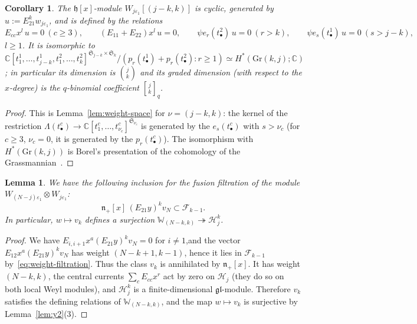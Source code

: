 \documentclass[11pt]{amsart}
\numberwithin{equation}{section}
\newtheorem{lemma}[equation]{Lemma}
\newtheorem{corollary}[equation]{Corollary}
\theoremstyle{definition}
\newcommand{\gl}{\mathfrak{gl}}
\newcommand{\fh}{\mathfrak{h}}
\newcommand{\fn}{\mathfrak{n}}
\newcommand{\bW}{\mathbb{W}}          %
\newcommand{\eps}{\varepsilon}
\newcommand{\Gr}{\mathrm{Gr}}
\newcommand{\Lam}{\Lambda}
\newcommand{\sS}{\mathfrak{S}}
\newcommand{\qbinom}[2]{\genfrac{[}{]}{0pt}{}{#1}{#2}_{q}}
\begin{document}
	\begin{corollary}\label{cor:weight}
		The $\fh[x]$-module $W_{j\eps_1}[(j-k,k)]$ is cyclic, generated by $u:=E_{21}^kw_{j\eps_1}$, and is defined by the relations
		\[
		E_{cc}x^l\,u=0\ (c\geq 3),\qquad (E_{11}+E_{22})x^l\,u=0,\qquad \psi e_r(t^2_{\bullet})\,u=0\ (r>k),\qquad \psi e_s(t^1_{\bullet})\,u=0\ (s>j-k),
		\]
		$l\ge1$. 
		It is isomorphic to $\mathbb C[t^1_1,\dots,t^1_{j-k},t^2_1,\dots,t^2_k]^{\sS_{j-k}\times\sS_k}/(p_r(t^1_\bullet)+p_r(t^2_\bullet):r\ge1)\simeq H^*(\Gr(k,j);\mathbb C)$; in particular its dimension is $\binom jk$ and its graded dimension (with respect to the $x$-degree) is the $q$-binomial coefficient $\qbinom jk$.
	\end{corollary}
	\begin{proof}
		This is Lemma~\ref{lem:weight-space} for $\nu=(j-k,k)$: the kernel of the restriction $\Lam(t^c_\bullet)\to\mathbb C[t^c_1,\dots,t^c_{\nu_c}]^{\sS_{\nu_c}}$ is generated by the $e_s(t^c_\bullet)$ with $s>\nu_c$ (for $c\ge3$, $\nu_c=0$, it is generated by the $p_r(t^c_\bullet)$). The isomorphism with $H^*(\Gr(k,j))$ is Borel's presentation of the cohomology of the Grassmannian~\cite{F}.
	\end{proof}
	
	\begin{lemma}\label{lem:HighestWectorSubquotion2}
		We have the following inclusion for the fusion filtration of the module $W_{(N-j)\varepsilon_1}\otimes W_{j\varepsilon_1}$:
		\[\fn_+[x]\,(E_{21}y)^k v_N \subset \mathcal{F}_{k-1}.\]
		In particular, $w\mapsto v_k$ defines a surjection $\bW_{(N-k,k)}\twoheadrightarrow\mathcal H_j^k$.
	\end{lemma}
	\begin{proof}
		We have $E_{i,i+1}x^a(E_{21}y)^kv_N=0$ for $i\neq 1$,and the vector $E_{12}x^a(E_{21}y)^kv_N$ has weight $(N-k+1,k-1)$, hence it lies in $\mathcal F_{k-1}$ by~\eqref{eq:weight-filtration}.
		Thus the class $v_k$ is annihilated by $\fn_+[x]$. It has weight $(N-k,k)$, the central currents $\sum_cE_{cc}x^r$ act by zero on $\mathcal H_j$ (they do so on both local Weyl modules), and $\mathcal H_j^k$ is a finite-dimensional $\gl$-module. Therefore $v_k$ satisfies the defining relations of $\bW_{(N-k,k)}$, and the map $w\mapsto v_k$ is surjective by Lemma~\ref{lem:y2}(3).
	\end{proof}
	
	
	
\end{document}
